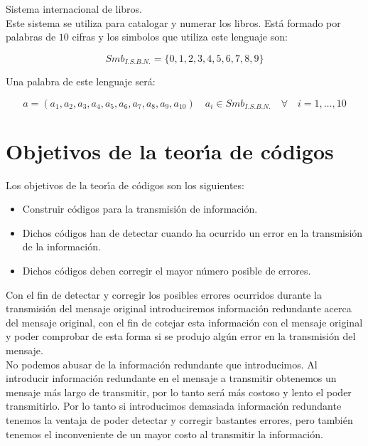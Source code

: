 \begin{ejemplo}[I.S.B.N.]
\ \\ \\
Sistema internacional de libros. \\

Este sistema se utiliza para catalogar y numerar los libros. Est\'a formado por
palabras de $10$ cifras y los simbolos que utiliza este lenguaje son:

\begin{displaymath}
Smb_{I.S.B.N.} = \{0, 1, 2, 3, 4, 5, 6, 7, 8, 9 \}
\end{displaymath}

Una palabra de este lenguaje ser\'a:

\begin{displaymath}
a=(a_1,a_2,a_3,a_4,a_5,a_6,a_7,a_8,a_9,a_{10})\quad a_i \in Smb_{I.S.B.N.}
\quad \forall \quad i=1,\ldots,10
\end{displaymath}
\end{ejemplo}
%
\newpage
%
\section{Objetivos de la teor\'{\i}a de c\'odigos}

Los objetivos de la teor\'{\i}a de c\'odigos son los siguientes:
\begin{itemize}
\item Construir c\'odigos para la transmisi\'on de informaci\'on.
\item Dichos c\'odigos han de detectar cuando ha ocurrido un error en la
transmisi\'on de la informaci\'on.
\item Dichos c\'odigos deben corregir el mayor n\'umero posible de errores.
\end{itemize}

Con el fin de detectar y corregir los posibles errores ocurridos durante la
transmisi\'on del mensaje original introduciremos informaci\'on redundante
acerca del mensaje original, con el fin de cotejar esta informaci\'on con el 
mensaje original y poder comprobar de esta forma si se produjo alg\'un error en
la transmisi\'on del mensaje.\\

No podemos abusar de la informaci\'on redundante que introducimos. Al
introducir informaci\'on redundante en el mensaje a transmitir obtenemos un
mensaje m\'as largo de transmitir, por lo tanto ser\'a m\'as costoso y lento
el poder transmitirlo. Por lo tanto si introducimos demasiada informaci\'on
redundante tenemos la ventaja de poder detectar y corregir bastantes errores,
pero tambi\'en tenemos el inconveniente de un mayor costo al transmitir la
informaci\'on.\\

